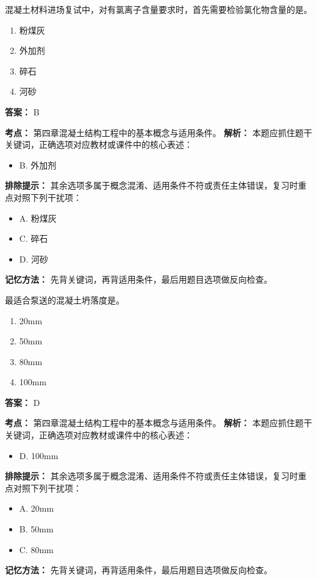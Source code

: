 \documentclass[UTF8,fontset=fandol,11pt]{ctexart}
\begin{document}
\begin{quizbox}[title={第 70 题}]
混凝土材料进场复试中，对有氯离子含量要求时，首先需要检验氯化物含量的是。\\
\begin{enumerate}[label=\Alph*.]
\item 粉煤灰
\item 外加剂
\item 碎石
\item 河砂
\end{enumerate}
\textbf{答案：} B
\vspace{0.25em}
\begin{answerbox}[title={考点解析}]
\textbf{考点：} 第四章混凝土结构工程中的基本概念与适用条件。
\textbf{解析：} 本题应抓住题干关键词，正确选项对应教材或课件中的核心表述：
\begin{itemize}
\item B. 外加剂
\end{itemize}
\textbf{排除提示：} 其余选项多属于概念混淆、适用条件不符或责任主体错误，复习时重点对照下列干扰项：
\begin{itemize}
\item A. 粉煤灰
\item C. 碎石
\item D. 河砂
\end{itemize}
\textbf{记忆方法：} 先背关键词，再背适用条件，最后用题目选项做反向检查。
\end{answerbox}
\end{quizbox}

\begin{quizbox}[title={第 71 题}]
最适合泵送的混凝土坍落度是。\\
\begin{enumerate}[label=\Alph*.]
\item 20mm
\item 50mm
\item 80mm
\item 100mm
\end{enumerate}
\textbf{答案：} D
\vspace{0.25em}
\begin{answerbox}[title={考点解析}]
\textbf{考点：} 第四章混凝土结构工程中的基本概念与适用条件。
\textbf{解析：} 本题应抓住题干关键词，正确选项对应教材或课件中的核心表述：
\begin{itemize}
\item D. 100mm
\end{itemize}
\textbf{排除提示：} 其余选项多属于概念混淆、适用条件不符或责任主体错误，复习时重点对照下列干扰项：
\begin{itemize}
\item A. 20mm
\item B. 50mm
\item C. 80mm
\end{itemize}
\textbf{记忆方法：} 先背关键词，再背适用条件，最后用题目选项做反向检查。
\end{answerbox}
\end{quizbox}
\end{document}
